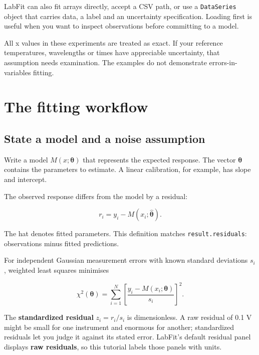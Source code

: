 \documentclass[
  british,
  10pt,
  a4paper,
]{article}
\newcommand{\passthrough}[1]{#1}
\begin{document}
LabFit can also fit arrays directly, accept a CSV path, or use a
\passthrough{\lstinline!DataSeries!} object that carries data, a label
and an uncertainty specification. Loading first is useful when you want
to inspect observations before committing to a model.

All x values in these experiments are treated as exact. If your
reference temperatures, wavelengths or times have appreciable
uncertainty, that assumption needs examination. The examples do not
demonstrate errors-in-variables fitting.

\clearpage

\section{The fitting workflow}\label{the-fitting-workflow}


\subsection{State a model and a noise
assumption}\label{state-a-model-and-a-noise-assumption}

Write a model \(M(x;\boldsymbol{\theta})\) that represents the expected
response. The vector \(\boldsymbol{\theta}\) contains the parameters to
estimate. A linear calibration, for example, has slope and intercept.

The observed response differs from the model by a residual:

\begin{equation}r_i = y_i - M(x_i;\hat{\boldsymbol{\theta}}).\end{equation}

The hat denotes fitted parameters. This definition matches
\passthrough{\lstinline!result.residuals!}: observations minus fitted
predictions.

For independent Gaussian measurement errors with known standard
deviations \(s_i\), weighted least squares minimises

\begin{equation}\chi^2(\boldsymbol{\theta})
= \sum_{i=1}^{N}\left[\frac{y_i-M(x_i;\boldsymbol{\theta})}{s_i}\right]^2.\end{equation}

The \textbf{standardized residual} \(z_i=r_i/s_i\) is dimensionless. A
raw residual of 0.1 V might be small for one instrument and enormous for
another; standardized residuals let you judge it against its stated
error. LabFit's default residual panel displays \textbf{raw residuals},
so this tutorial labels those panels with units.
\end{document}
